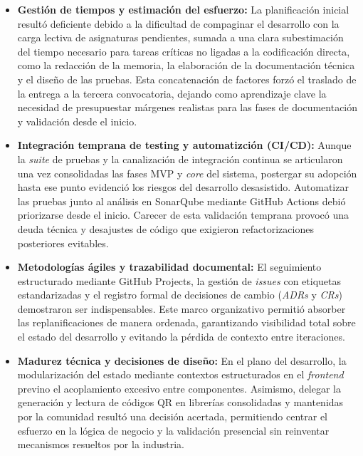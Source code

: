 \begin{itemize}
    \item \textbf{Gestión de tiempos y estimación del esfuerzo:} La planificación inicial resultó deficiente debido a la dificultad de compaginar el desarrollo con la carga lectiva de asignaturas pendientes, sumada a una clara subestimación del tiempo necesario para tareas críticas no ligadas a la codificación directa, como la redacción de la memoria, la elaboración de la documentación técnica y el diseño de las pruebas. Esta concatenación de factores forzó el traslado de la entrega a la tercera convocatoria, dejando como aprendizaje clave la necesidad de presupuestar márgenes realistas para las fases de documentación y validación desde el inicio.

    \item \textbf{Integración temprana  de testing y automatizción (CI/CD):} Aunque la \textit{suite} de pruebas y la canalización de integración continua se articularon una vez consolidadas las fases MVP y \textit{core} del sistema, postergar su adopción hasta ese punto evidenció los riesgos del desarrollo desasistido. Automatizar las pruebas junto al análisis en SonarQube mediante GitHub Actions debió priorizarse desde el inicio. Carecer de esta validación temprana provocó una deuda técnica y desajustes de código que exigieron refactorizaciones posteriores evitables.

    \item \textbf{Metodologías ágiles y trazabilidad documental:} El seguimiento estructurado mediante GitHub Projects, la gestión de \textit{issues} con etiquetas estandarizadas y el registro formal de decisiones de cambio (\textit{ADRs} y \textit{CRs}) demostraron ser indispensables. Este marco organizativo permitió absorber las replanificaciones de manera ordenada, garantizando visibilidad total sobre el estado del desarrollo y evitando la pérdida de contexto entre iteraciones.

    \item \textbf{Madurez técnica y decisiones de diseño:} En el plano del desarrollo, la modularización del estado mediante contextos estructurados en el \textit{frontend} previno el acoplamiento excesivo entre componentes. Asimismo, delegar la generación y lectura de códigos QR en librerías consolidadas y mantenidas por la comunidad resultó una decisión acertada, permitiendo centrar el esfuerzo en la lógica de negocio y la validación presencial sin reinventar mecanismos resueltos por la industria.
\end{itemize}

